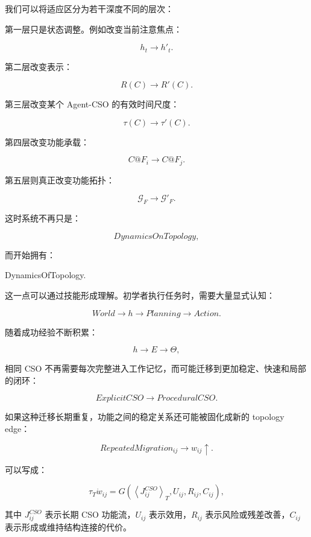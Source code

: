 我们可以将适应区分为若干深度不同的层次：

\begin{statementbox}
\centering
{}
\end{statementbox}

第一层只是状态调整。例如改变当前注意焦点：

\[
h_t
\rightarrow
h'_t.
\]

第二层改变表示：

\[
R(C)
\rightarrow
R'(C).
\]

第三层改变某个 Agent-CSO 的有效时间尺度：

\[
\tau(C)
\rightarrow
\tau'(C).
\]

第四层改变功能承载：

\[
C@F_i
\rightarrow
C@F_j.
\]

第五层则真正改变功能拓扑：

\[
\mathcal G_F
\rightarrow
\mathcal G'_F.
\]

这时系统不再只是：

\[
DynamicsOnTopology,
\]

而开始拥有：

\begin{statementbox}
DynamicsOfTopology.
\end{statementbox}

这一点可以通过技能形成理解。初学者执行任务时，需要大量显式认知：

\[
World
\rightarrow
h
\rightarrow
Planning
\rightarrow
Action.
\]

随着成功经验不断积累：

\[
h
\rightarrow
E
\rightarrow
\Theta,
\]

相同 CSO 不再需要每次完整进入工作记忆，而可能迁移到更加稳定、快速和局部的闭环：

\[
ExplicitCSO
\rightarrow
ProceduralCSO.
\]

如果这种迁移长期重复，功能之间的稳定关系还可能被固化成新的 topology edge：

\[
RepeatedMigration_{ij}
\rightarrow
w_{ij}\uparrow.
\]

可以写成：

\[
\tau_T
\dot w_{ij}
=
G
\left(
\left\langle
J^{CSO}_{ij}
\right\rangle_T,
U_{ij},
R_{ij},
C_{ij}
\right),
\]

其中 \(J^{CSO}_{ij}\) 表示长期 CSO 功能流，\(U_{ij}\) 表示效用，\(R_{ij}\) 表示风险或残差改善，\(C_{ij}\) 表示形成或维持结构连接的代价。

